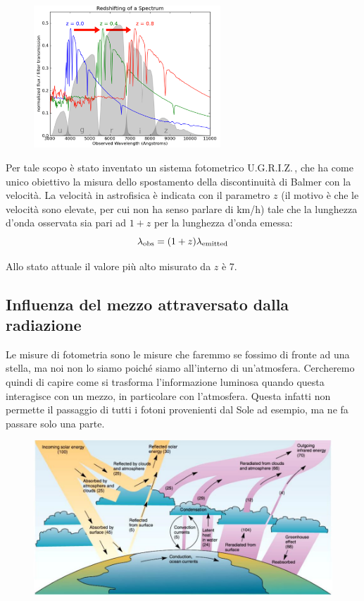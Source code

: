 \begin{minipage}{0.445\textwidth}
   \begin{figure}[H]
      \includegraphics[width=7cm]{immagini/redshift.png}
   \end{figure}
\end{minipage}
\begin{minipage}{0.55\textwidth}
   \vspace{0.4cm}Per tale scopo è stato inventato un sistema fotometrico U.G.R.I.Z.\,, che ha come unico obiettivo la misura dello spostamento della discontinuità di Balmer con la velocità. La velocità in astrofisica è indicata con il parametro $z$ (il motivo è che le velocità sono elevate, per cui non ha senso parlare di km/h) tale che la lunghezza d'onda osservata sia pari ad $1+z$ per la lunghezza d'onda emessa:
   $$\lambda_{\rm obs}=(1+z)\lambda_{\rm emitted}$$
\end{minipage}

\vspace{0.2cm}Allo stato attuale il valore più alto misurato da $z$ è 7.

\subsection{Influenza del mezzo attraversato dalla radiazione}

Le misure di fotometria sono le misure che faremmo se fossimo di fronte ad una stella, ma noi non lo siamo poiché siamo all'interno di un'atmosfera. Cercheremo quindi di capire come si trasforma l'informazione luminosa quando questa interagisce con un mezzo, in particolare con l'atmosfera. Questa infatti non permette il passaggio di tutti i fotoni provenienti dal Sole ad esempio, ma ne fa passare solo una parte.

\begin{figure}[H]
   \centering
   \includegraphics[width=12cm]{immagini/effetto_atmosfera_fotoni.png}
\end{figure}

